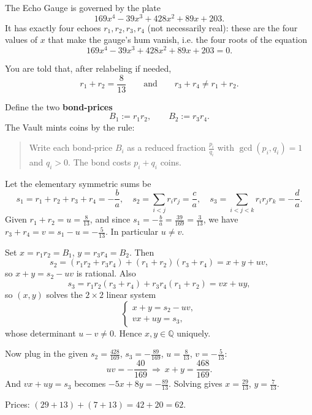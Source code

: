 
\Problem
The Echo Gauge is governed by the plate
\[
169x^4 - 39x^3 + 428x^2 + 89x + 203.
\]
It has exactly four echoes \(r_1,r_2,r_3,r_4\) (not necessarily real): these are the four values of \(x\) that make the gauge’s hum vanish,
i.e. the four roots of the equation
\[
169x^4 - 39x^3 + 428x^2 + 89x + 203=0.
\]

You are told that, after relabeling if needed,
\[
r_1+r_2=\frac{8}{13}
\qquad\text{and}\qquad
r_3+r_4\ne r_1+r_2.
\]

Define the two \textbf{bond-prices}
\[
B_1:=r_1r_2,\qquad B_2:=r_3r_4.
\]
The Vault mints coins by the rule:

\begin{quote}
Write each bond-price \(B_i\) as a reduced fraction \(\frac{p_i}{q_i}\) with \(\gcd(p_i,q_i)=1\) and \(q_i>0\).
The bond costs \(p_i+q_i\) coins.
\end{quote}


\SolutionPage
Let the elementary symmetric sums be
\[
s_1=r_1+r_2+r_3+r_4=-\frac{b}{a},\quad
s_2=\sum_{i<j}r_ir_j=\frac{c}{a},\quad
s_3=\sum_{i<j<k}r_ir_jr_k=-\frac{d}{a}.
\]
Given \(r_1+r_2=u=\frac{8}{13}\), and since \(s_1=-\frac{b}{a}=\frac{39}{169}=\frac{3}{13}\), we have \(r_3+r_4=v=s_1-u=-\frac{5}{13}\). In particular \(u\ne v\).

Set \(x=r_1r_2=B_1\), \(y=r_3r_4=B_2\).
Then
\[
s_2 = (r_1r_2+r_3r_4) + (r_1+r_2)(r_3+r_4)=x+y+uv,
\]
so \(x+y=s_2-uv\) is rational.
Also
\[
s_3=r_1r_2(r_3+r_4)+r_3r_4(r_1+r_2)=vx+uy,
\]
so \((x,y)\) solves the \(2\times2\) linear system
\[
\begin{cases}
x+y=s_2-uv,\\
vx+uy=s_3,
\end{cases}
\]
whose determinant \(u-v\neq0\). Hence \(x,y\in\mathbb Q\) uniquely.

Now plug in the given \(s_2=\frac{428}{169}\), \(s_3=-\frac{89}{169}\), \(u=\frac{8}{13}\), \(v=-\frac{5}{13}\):
\[
uv=-\frac{40}{169}\ \Rightarrow\ x+y=\frac{468}{169}.
\]
And \(vx+uy=s_3\) becomes \(-5x+8y=-\frac{89}{13}\).
Solving gives \(x=\frac{29}{13}\), \(y=\frac{7}{13}\).

Prices: \((29+13)+(7+13)=42+20=62\).


\NextPage
